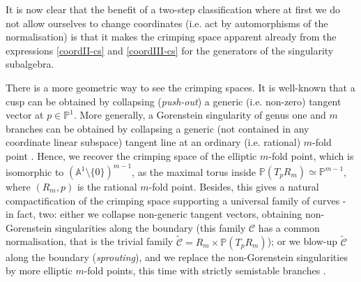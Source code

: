 \documentclass[11pt]{amsart}
\newcommand{\PP}{\mathbb P}
\newcommand{\Aaff}{\mathbb A}
\theoremstyle{plain}
\theoremstyle{definition}
\begin{document}
It is now clear that the benefit of a two-step classification where at first we do not allow ourselves to change coordinates (i.e. act by automorphisms of the normalisation) is that it makes the crimping space apparent already from the expressions \eqref{coordII-cs} and \eqref{coordIII-cs} for the generators of the singularity subalgebra.

\smallskip

There is a more geometric way to see the crimping spaces. It is well-known that a cusp can be obtained by collapsing (\emph{push-out}) a generic (i.e. non-zero) tangent vector at $p\in\PP^1$. More generally, a Gorenstein singularity of genus one and $m$ branches can be obtained by collapsing a generic (not contained in any coordinate linear subspace) tangent line at an ordinary (i.e. rational) $m$-fold point \cite[Lemma 2.2]{SMY1}. Hence, we recover the crimping space of the elliptic $m$-fold point, which is isomorphic to $(\Aaff^1\setminus\{0\})^{m-1}$, as the maximal torus inside $\PP(T_pR_m)\simeq\PP^{m-1}$, where $(R_m,p)$ is the rational $m$-fold point. Besides, this gives a natural compactification of the crimping space supporting a universal family of curves - in fact, two: either we collapse non-generic tangent vectors, obtaining non-Gorenstein singularities along the boundary (this family $\mathcal C$ has a common normalisation, that is the trivial family $\widetilde{\mathcal C}=R_m\times \PP(T_pR_m)$); or we blow-up $\widetilde{\mathcal C}$ along the boundary (\emph{sprouting}), and we replace the non-Gorenstein singularities by more elliptic $m$-fold points, this time with strictly semistable branches \cite[\S 2.2-3]{SMY2}.
\end{document}

